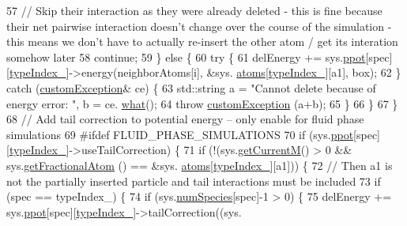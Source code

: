 \begin{DoxyCode}
57                 \textcolor{comment}{// Skip their interaction as they were already deleted - this is fine because their net
       pairwise interaction doesn't change over the course of the simulation - this means we don't have to actually
       re-insert the other atom / get its interation somehow later}
58                 \textcolor{keywordflow}{continue};
59             \} \textcolor{keywordflow}{else} \{
60                 \textcolor{keywordflow}{try} \{
61                     delEnergy += sys.\hyperlink{classsim_system_ad2e290b5963f132e6a3a56cee35c8e9f}{ppot}[spec][\hyperlink{classmc_move_acb731965547b0326ef318ec96da8b46a}{typeIndex\_}]->energy(neighborAtoms[i], &sys.
      \hyperlink{classsim_system_a90421b19082f7fb8fc23b7264b1161e4}{atoms}[\hyperlink{classmc_move_acb731965547b0326ef318ec96da8b46a}{typeIndex\_}][a1], box);
62                 \} \textcolor{keywordflow}{catch} (\hyperlink{classcustom_exception}{customException}& ce) \{
63                     std::string a = \textcolor{stringliteral}{"Cannot delete because of energy error: "}, b = ce.
      \hyperlink{classcustom_exception_aeb6ab5848b038adfc68fde86a512f691}{what}();
64                     \textcolor{keywordflow}{throw} \hyperlink{classcustom_exception}{customException} (a+b);
65                 \}
66             \}
67         \}
68         \textcolor{comment}{// Add tail correction to potential energy -- only enable for fluid phase simulations}
69 \textcolor{preprocessor}{#ifdef FLUID\_PHASE\_SIMULATIONS}
70 \textcolor{preprocessor}{}        \textcolor{keywordflow}{if} (sys.\hyperlink{classsim_system_ad2e290b5963f132e6a3a56cee35c8e9f}{ppot}[spec][\hyperlink{classmc_move_acb731965547b0326ef318ec96da8b46a}{typeIndex\_}]->useTailCorrection) \{
71             \textcolor{keywordflow}{if} (!(sys.\hyperlink{classsim_system_a299fe4372e610b554eaaf5f5957b2dbc}{getCurrentM}() > 0 && sys.\hyperlink{classsim_system_a2ab77377c60e0e3109a6e875690b0ab7}{getFractionalAtom} () == &sys.
      \hyperlink{classsim_system_a90421b19082f7fb8fc23b7264b1161e4}{atoms}[\hyperlink{classmc_move_acb731965547b0326ef318ec96da8b46a}{typeIndex\_}][a1])) \{
72                 \textcolor{comment}{// Then a1 is not the partially inserted particle and tail interactions must be included}
73                 \textcolor{keywordflow}{if} (spec == typeIndex\_) \{
74                     \textcolor{keywordflow}{if} (sys.\hyperlink{classsim_system_a9eea865e6dc1cff377b1e79c4d9c23f0}{numSpecies}[spec]-1 > 0) \{
75                         delEnergy += sys.\hyperlink{classsim_system_ad2e290b5963f132e6a3a56cee35c8e9f}{ppot}[spec][\hyperlink{classmc_move_acb731965547b0326ef318ec96da8b46a}{typeIndex\_}]->tailCorrection((sys.

\end{DoxyCode}
